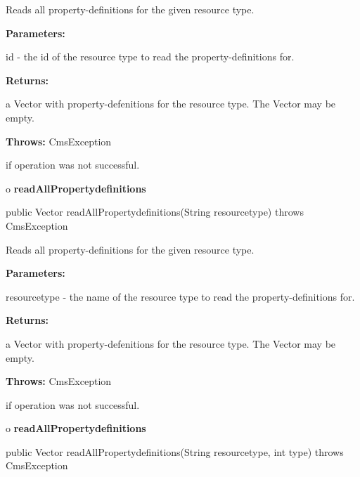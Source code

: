 \begin{description}
\htmlDD Reads all property-definitions for the given resource type. 

\begin{description}
\item {\bf Parameters:}  

id - the id of the resource type to read the property-definitions for.  
\item {\bf Returns:}  

a Vector with property-defenitions for the resource type. The Vector may be
empty.  
\item {\bf Throws:} CmsException  

if operation was not successful.  
\end{description}

\end{description}

o {\bf readAllPropertydefinitions} 

\begin{PRE}
 public Vector readAllPropertydefinitions(String resourcetype) throws CmsException
\end{PRE}

\begin{description}
\htmlDD Reads all property-definitions for the given resource type. 

\begin{description}
\item {\bf Parameters:}  

resourcetype - the name of the resource type to read the property-definitions
for.  
\item {\bf Returns:}  

a Vector with property-defenitions for the resource type. The Vector may be
empty.  
\item {\bf Throws:} CmsException  

if operation was not successful.  
\end{description}

\end{description}

o {\bf readAllPropertydefinitions} 

\begin{PRE}
 public Vector readAllPropertydefinitions(String resourcetype,
                                          int type) throws CmsException
\end{PRE}


